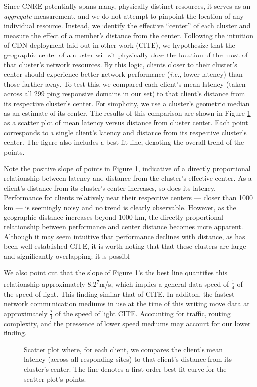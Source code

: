 Since CNRE potentially spans many, physically distinct resources, it serves as
an \emph{aggregate} measurement, and we do not attempt to pinpoint the location
of any individual resource. Instead, we identify the effective ``center'' of
each cluster and measure the effect of a member's distance from the center.
Following the intuition of CDN deployment laid out in other work (CITE), we
hypothesize that the geographic center of a cluster will sit physically close
the location of the most of that cluster's network resources. By this logic,
clients closer to their cluster's center should experience better network
performance (\emph{i.e.}, lower latency) than those farther away. To test this,
we compared each client's mean latency (taken across all 299 ping responsive domains
in our set) to that client's distance from its respective cluster's center. For
simplicity, we use a cluster's geometric median as an estimate of its center.
The results of this comparison are shown in Figure \ref{geoperf} as a scatter
plot of mean latency versus distance from cluster center. Each point corresponds
to a single client's latency and distance from its respective cluster's center.
The figure also includes a best fit line, denoting the overall trend of the
points. 

Note the positive slope of points in Figure \ref{geoperf}, indicative of a
directly proportional relationship between latency and distance from the
cluster's effective center. As a client's distance from its cluster's center
increases, so does its latency. Performance for clients relatively near their
respective centers --- closer than 1000 km --- is seemingly noisy and no trend
is clearly observable.  However, as the geographic distance increases beyond
1000 km, the directly proportional relationship between performance and center
distance becomes more apparent. Although it may seem intuitive that performance
declines with distance, as has been well established CITE, it is worth noting
that that these clusters are large and significantly overlapping: it is possibl


We also point out that the slope of Figure \ref{geoperf}'s the
best line quantifies this relationship approximately
8.2\textsuperscript{7}m/s, which implies a general data speed of
$\frac{1}{4}$ of the speed of light. This finding similar that of CITE. In additon, the
fastest network communication mediums in use at the time of this writing move
data at approximately $\frac{2}{3}$ of the speed of light CITE. Accounting for
traffic, routing complexity, and the pressence of lower speed mediums may
account for our lower finding.

\begin{figure}
    \caption{Scatter plot where, for each client, we compares the client's mean latency
    (across all responding sites) to that client's distance from its cluster's
    center. The line denotes a first order best fit curve for the scatter plot's points.}
    \label{geoperf}
\end{figure}
